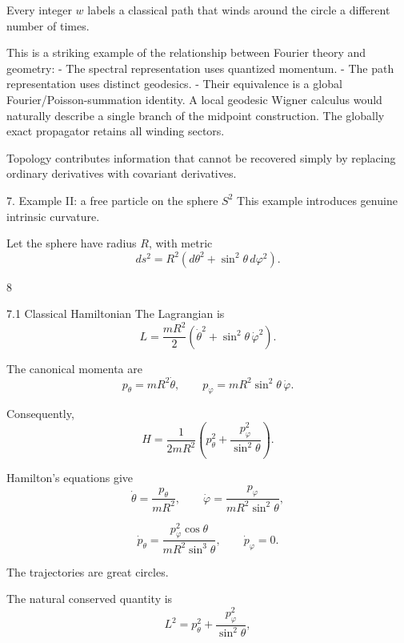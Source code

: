Every integer \(w\) labels a classical path that winds around the circle a different number of times.

This is a striking example of the relationship between Fourier theory and geometry:
- The spectral representation uses quantized momentum.
- The path representation uses distinct geodesics.
- Their equivalence is a global Fourier/Poisson-summation identity.
A local geodesic Wigner calculus would naturally describe a single branch of the midpoint construction. The globally exact propagator retains all winding sectors.

Topology contributes information that cannot be recovered simply by replacing ordinary derivatives with covariant derivatives.

7. Example II: a free particle on the sphere \(S^2\)
This example introduces genuine intrinsic curvature.

Let the sphere have radius \(R\), with metric
\[
ds^2=R^2(d\theta^2+\sin^2\theta\,d\varphi^2).
\tag{67}
\]





















8










7.1 Classical Hamiltonian
The Lagrangian is
\[
L=\frac{mR^2}{2}
\left(\dot\theta^2+\sin^2\theta\,\dot\varphi^2\right).
\]

The canonical momenta are
\[
p_\theta=mR^2\dot\theta,
\qquad
p_\varphi=mR^2\sin^2\theta\,\dot\varphi.
\]

Consequently,
\[
\boxed{
H=
\frac1{2mR^2}
\left(
p_\theta^2+
\frac{p_\varphi^2}{\sin^2\theta}
\right).
}
\tag{68}
\]

Hamilton's equations give
\[
\dot\theta=\frac{p_\theta}{mR^2},
\qquad
\dot\varphi=\frac{p_\varphi}{mR^2\sin^2\theta},
\tag{69}
\]

\[
\dot p_\theta=
\frac{p_\varphi^2\cos\theta}
{mR^2\sin^3\theta},
\qquad
\dot p_\varphi=0.
\tag{70}
\]

The trajectories are great circles.

The natural conserved quantity is
\[
L^2=p_\theta^2+
\frac{p_\varphi^2}{\sin^2\theta},
\]


